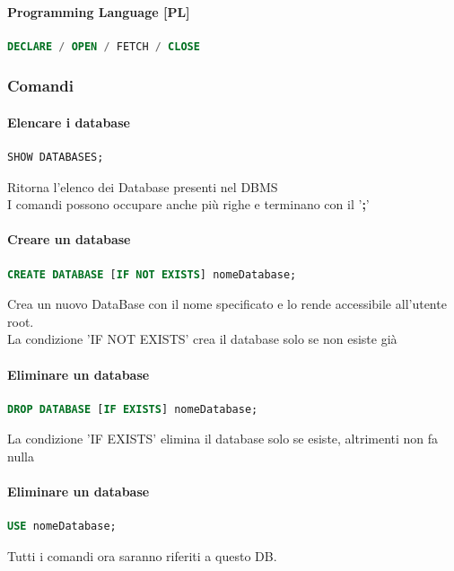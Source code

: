 \documentclass[12pt,a4paper]{article}
\begin{document}
\paragraph{Programming Language [PL]}
\flushleft
\begin{lstlisting}[language = SQL]
DECLARE / OPEN / FETCH / CLOSE
\end{lstlisting}

\subsubsection{Comandi}
\paragraph{Elencare i database}
\flushleft
\begin{lstlisting}[language = SQL]
SHOW DATABASES;
\end{lstlisting}
Ritorna l'elenco dei Database presenti nel DBMS\\
I comandi possono occupare anche più righe e terminano con il '\textbf{;}'

\paragraph{Creare un database}
\flushleft
\begin{lstlisting}[language = SQL]
CREATE DATABASE [IF NOT EXISTS] nomeDatabase;
\end{lstlisting}
Crea un nuovo DataBase con il nome specificato e lo rende accessibile all’utente root.\\
La condizione 'IF NOT EXISTS' crea il database solo se non esiste già

\paragraph{Eliminare un database}
\flushleft
\begin{lstlisting}[language = SQL]
DROP DATABASE [IF EXISTS] nomeDatabase;
\end{lstlisting}
La condizione 'IF EXISTS' elimina il database solo se esiste, altrimenti non fa nulla

\paragraph{Eliminare un database}
\flushleft
\begin{lstlisting}[language = SQL]
USE nomeDatabase;
\end{lstlisting}
Tutti i comandi ora saranno riferiti a questo DB.
\end{document}

